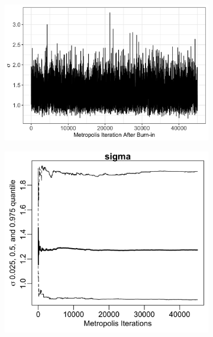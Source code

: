 \documentclass{uwstat572}
\begin{document}
\begin{figure}[H]
	\centering
	\begin{subfigure}[b]{\textwidth}
		\includegraphics[width=\textwidth]{figures/sigma_mcmc_chain.png}
		\caption{}
	\label{fig:chain_sigma}
	\end{subfigure}
	\qquad
	\begin{subfigure}[b]{0.49\textwidth}
		\includegraphics[width=\textwidth]{figures/mcmc_cum_quant_plot_sigma.png}
		\caption{}
		\label{fig:quant_sigma}
	\end{subfigure}
	\hfill
	\begin{subfigure}[b]{0.49\textwidth}

\end{subfigure}
\end{figure}
\end{document}
